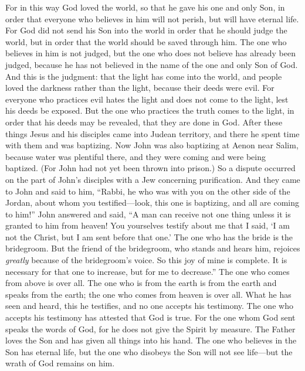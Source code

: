 \begin{biblechapter}
 For in this way God loved the world, so that he gave his one and only Son, in order that everyone who believes in him will not perish, but will have eternal life.
\verse For God did not send his Son into the world in order that he should judge the world, but in order that the world should be saved through him.
\verse The one who believes in him is not judged, but the one who does not believe has already been judged, because he has not believed in the name of the one and only Son of God.
\verse And this is the judgment: that the light has come into the world, and people loved the darkness rather than the light, because their deeds were evil.
\verse For everyone who practices evil hates the light and does not come to the light, lest his deeds be exposed.
\verse But the one who practices the truth comes to the light, in order that his deeds may be revealed, that they are done in God.
 After these things Jesus and his disciples came into Judean territory, and there he spent time with them and was baptizing.
\verse Now John was also baptizing at Aenon near Salim, because water was plentiful there, and they were coming and were being baptized.
\verse (For John had not yet been thrown into prison.)
\verse So a dispute occurred on the part of John’s disciples with a Jew concerning purification.
\verse And they came to John and said to him, “Rabbi, he who was with you on the other side of the Jordan, about whom you testified—look, this one is baptizing, and all are coming to him!”
\verse John answered and said, “A man can receive not one thing unless it is granted to him from heaven!
\verse You yourselves testify about me that I said, ‘I am not the Christ, but I am sent before that one.’
\verse The one who has the bride is the bridegroom. But the friend of the bridegroom, who stands and hears him, rejoices \textit{greatly} because of the bridegroom’s voice. So this joy of mine is complete.
\verse It is necessary for that one to increase, but for me to decrease.”
\verse The one who comes from above is over all. The one who is from the earth is from the earth and speaks from the earth; the one who comes from heaven is over all.
\verse What he has seen and heard, this he testifies, and no one accepts his testimony.
\verse The one who accepts his testimony has attested that God is true.
\verse For the one whom God sent speaks the words of God, for he does not give the Spirit by measure.
\verse The Father loves the Son and has given all things into his hand.
\verse The one who believes in the Son has eternal life, but the one who disobeys the Son will not see life—but the wrath of God remains on him.
\end{biblechapter}


